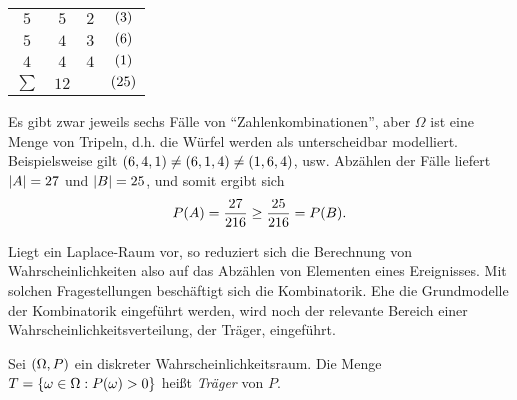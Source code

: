 \documentclass{lecture}
\begin{document}
\begin{example}
\begin{center}
\begin{tabular}{cccc}
                \(5\) & \(5\) & \(2\) & \(\parentheses*{3}\)\\
                \(5\) & \(4\) & \(3\) & \(\parentheses*{6}\)\\
                \(4\) & \(4\) & \(4\) & \(\parentheses*{1}\)\\
                \midrule
                \(\sum\) & \(12\) & & \(\parentheses*{25}\)\\
                \bottomrule
            \end{tabular}
        \end{center}
        Es gibt zwar jeweils sechs Fälle von ``Zahlenkombinationen'', aber \(\Omega\) ist eine Menge von Tripeln, d.h. die Würfel werden als unterscheidbar modelliert.
        Beispielsweise gilt \(\parentheses*{6, 4, 1} \ne \parentheses*{6, 1, 4} \ne \parentheses*{1, 6, 4}\), usw.
        Abzählen der Fälle liefert \(\absolute*{A} = 27\) und \(\absolute*{B} = 25\), und somit ergibt sich
        \[
            P\parentheses*{A} = \frac{27}{216} \ge \frac{25}{216} = P\parentheses*{B}.
        \]
    \end{example}

    Liegt ein Laplace-Raum vor, so reduziert sich die Berechnung von Wahrscheinlichkeiten also auf das Abzählen von Elementen eines Ereignisses.
    Mit solchen Fragestellungen beschäftigt sich die Kombinatorik.
    Ehe die Grundmodelle der Kombinatorik eingeführt werden, wird noch der relevante Bereich einer Wahrscheinlichkeitsverteilung, der Träger, eingeführt.

    \begin{definition}
        Sei \(\parentheses*{\Omega, P}\) ein diskreter Wahrscheinlichkeitsraum.
        Die Menge \(T = \braces*{\omega \in \Omega : P\parentheses*{\omega} > 0}\) heißt \emph{Träger} von \(P\).
    \end{definition}
\end{document}
